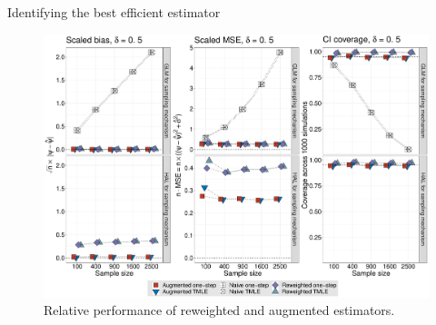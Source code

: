\documentclass{beamer}
\begin{document}
\begin{frame}[c]{Identifying the best efficient estimator}

\begin{figure}[H]
  \centering
  \includegraphics[scale=0.22]{simple_effect_panel_delta_upshift}
  \caption{
    Relative performance of reweighted and augmented estimators.
  }
\end{figure}

\note{
}

\end{frame}

\end{document}

